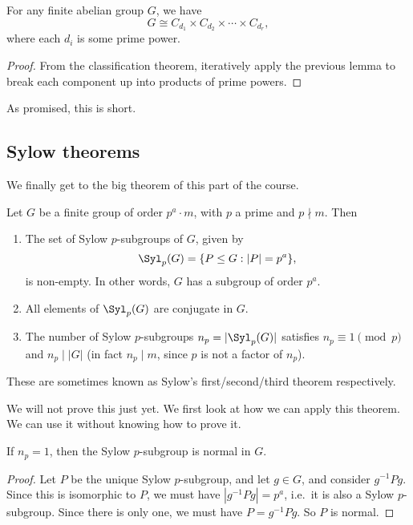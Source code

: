 \documentclass[a4paper]{article}
\begin{document}
\begin{cor}
  For any finite abelian group $G$, we have
  \[
    G \cong C_{d_1} \times C_{d_2} \times \cdots \times C_{d_r},
  \]
  where each $d_i$ is some prime power.
\end{cor}

\begin{proof}
  From the classification theorem, iteratively apply the previous lemma to break each component up into products of prime powers.
\end{proof}

As promised, this is short.

\subsection{Sylow theorems}
We finally get to the big theorem of this part of the course.
\begin{thm}
  Let $G$ be a finite group of order $p^a \cdot m$, with $p$ a prime and $p \nmid m$. Then
  \begin{enumerate}
    \item The set of Sylow $p$-subgroups of $G$, given by
      \[
        \Syl_p(G) = \{P \leq G: |P| = p^a\},
      \]
      is non-empty. In other words, $G$ has a subgroup of order $p^a$.
    \item All elements of $\Syl_p(G)$ are conjugate in $G$.
    \item The number of Sylow $p$-subgroups $n_p = |\Syl_p(G)|$ satisfies $n_p \equiv 1 \pmod p$ and $n_p \mid |G|$ (in fact $n_p \mid m$, since $p$ is not a factor of $n_p$).
  \end{enumerate}
\end{thm}
These are sometimes known as Sylow's first/second/third theorem respectively.

We will not prove this just yet. We first look at how we can apply this theorem. We can use it without knowing how to prove it.

\begin{lemma}
  If $n_p = 1$, then the Sylow $p$-subgroup is normal in $G$.
\end{lemma}

\begin{proof}
  Let $P$ be the unique Sylow $p$-subgroup, and let $g \in G$, and consider $g^{-1}Pg$. Since this is isomorphic to $P$, we must have $|g^{-1} Pg| = p^a$, i.e.\ it is also a Sylow $p$-subgroup. Since there is only one, we must have $P = g^{-1}Pg$. So $P$ is normal.
\end{proof}
\end{document}

